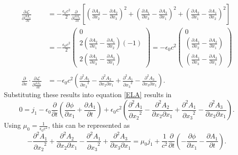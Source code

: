 \documentclass[prb,preprint]{revtex4-1}
\begin{document}
\begin{align}
\frac{\partial \mathcal{L}}{\partial \frac{\partial A_1}{\partial x} }
&= - \frac{\epsilon_0 c^2}{2} \frac{\partial}{\partial \frac{\partial A_1}{\partial x}}
\left[
\left(\frac{\partial A_3}{\partial x_2} - \frac{\partial A_2}{\partial x_3} \right)^2
+ \left(\frac{\partial A_1}{\partial x_3} - \frac{\partial A_3}{\partial x_1} \right)^2
+ \left(\frac{\partial A_2}{\partial x_1} - \frac{\partial A_1}{\partial x_2} \right)^2
\right] \\
&=
- \frac{\epsilon_0 c^2}{2} 
\left(
\begin{array}{c} 
0
\\
2 \left(\frac{\partial A_2}{\partial x_1} - \frac{\partial A_1}{\partial x_2} \right) (-1)
\\
2 \left(\frac{\partial A_1}{\partial x_3} - \frac{\partial A_3}{\partial x_1} \right)
\end{array}
\right)
= 
- \epsilon_0 c^2
\left(
\begin{array}{c} 
0
\\
\left(\frac{\partial A_1}{\partial x_2} - \frac{\partial A_2}{\partial x_1} \right)
\\
\left(\frac{\partial A_1}{\partial x_3} - \frac{\partial A_3}{\partial x_1} \right)
\end{array}
\right) \\ \nonumber \\
\frac{\partial}{\partial x} \cdot \frac{\partial \mathcal{L}}{\partial \frac{\partial A_1}{\partial x} }
&= - \epsilon_0 c^2
\left( \frac{\partial^2 A_1}{{\partial x_2}^2} - \frac{\partial^2 A_2}{\partial x_2 \partial x_1}
+ \frac{\partial^2 A_1}{{\partial x_3}^2} - \frac{\partial^2 A_3}{\partial x_3 \partial x_1} \right).
\end{align}
Substituting these results into equation \eqref{ELA} results in
\begin{equation}
0= j_1 
- \epsilon_0 \frac{\partial}{\partial t} \left(\frac{\partial \phi}{\partial x_1} + \frac{\partial A_1}{\partial t} \right)
+ \epsilon_0 c^2 
\left( \frac{\partial^2 A_1}{{\partial x_2}^2} - \frac{\partial^2 A_2}{\partial x_2 \partial x_1}
+ \frac{\partial^2 A_1}{{\partial x_3}^2} - \frac{\partial^2 A_3}{\partial x_3 \partial x_1} \right).
\end{equation}
Using $\mu_0 = \frac{1}{\epsilon_0 c^2}$, this can be represented as
\begin{equation}
 - \frac{\partial^2 A_1}{{\partial x_2}^2} + \frac{\partial^2 A_2}{\partial x_2 \partial x_1}
- \frac{\partial^2 A_1}{{\partial x_3}^2} + \frac{\partial^2 A_3}{\partial x_3 \partial x_1}
= \mu_0 j_1 
+ \frac{1}{c^2} \frac{\partial}{\partial t} \left(-\frac{\partial \phi}{\partial x_1} - \frac{\partial A_1}{\partial t} \right).
\end{equation}
\end{document}
